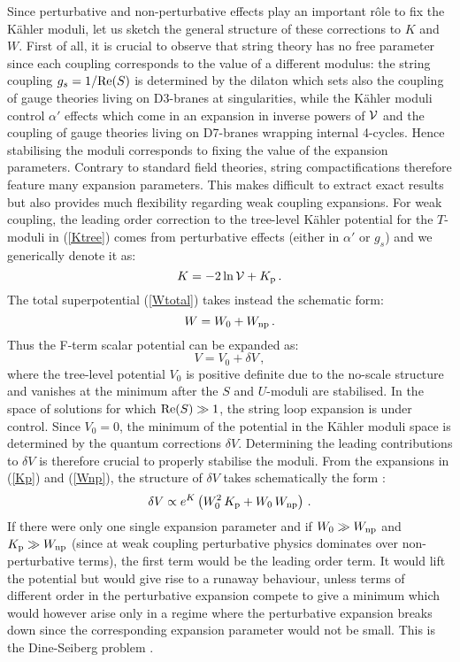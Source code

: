 \documentclass[11pt,a4paper]{article}
\newcommand{\be}{\begin{equation}}
\newcommand{\ee}{\end{equation}}
\newcommand{\vo}{\mathcal{V}}
\def\vo{{{\cal{V}}}}
\begin{document}
Since perturbative and non-perturbative effects play an important r\^ole to fix the K\"ahler moduli, let us sketch the general structure of these corrections to $K$ and $W$. First of all, it is crucial to observe that string theory has no free parameter since each coupling corresponds to the value of a different modulus: the string coupling $g_s = 1/{\rm Re}(S)$ is determined by the dilaton which sets also the coupling of gauge theories living on D3-branes at singularities, while the K\"ahler moduli control $\alpha'$ effects which come in an expansion in inverse powers of $\vo$ and the coupling of gauge theories living on D7-branes wrapping internal 4-cycles. Hence stabilising the moduli corresponds to fixing the value of the expansion parameters. Contrary to standard field theories, string compactifications therefore feature many expansion parameters. This makes difficult to extract exact results but also provides much flexibility regarding weak coupling expansions. For weak coupling, the leading order correction to the tree-level K\"ahler potential for the $T$-moduli in (\ref{Ktree}) comes from perturbative effects (either in $\alpha'$ or $g_s$) and we generically denote it as:
\be
K=-2\ln\vo+ K_{\rm p}\,.
\label{Kp}
\ee
The total superpotential (\ref{Wtotal}) takes instead the schematic form:
\be
W=W_0+ W_{\rm np}\,.
\label{Wnp}
\ee
Thus the F-term scalar potential can be expanded as: 
\be
V=V_0 +\delta V\,,
\ee
where the tree-level potential $V_0$ is positive definite due to the no-scale structure and vanishes at the minimum after the $S$ and $U$-moduli are stabilised. In the space of solutions for which ${\rm Re}(S)\gg 1$, the string loop expansion is under control. Since $V_0=0$, the minimum of the potential in the K\"ahler moduli space is determined by the quantum corrections $\delta V$. Determining the leading contributions to $\delta V$ is therefore crucial to properly stabilise the moduli. From the expansions in (\ref{Kp}) and (\ref{Wnp}), the structure of $\delta V$ takes schematically the form \cite{Conlon:2005ki}:
\be
\delta V\propto e^K\left( W_0^2 \,K_{\rm p} + W_0\, W_{\rm np}\right)\,.
\label{eq:deltaV}
\ee 
If there were only one single expansion parameter and if $W_0\gg W_{\rm np}$ and $K_{\rm p}\gg W_{\rm np}$ (since at weak coupling perturbative physics dominates over non-perturbative terms), the first term would be the leading order term. It would lift the potential but would give rise to a runaway behaviour, unless terms of different order in the perturbative expansion compete to give a minimum which would however arise only in a regime where the perturbative expansion breaks down since the corresponding expansion parameter would not be small. This is the Dine-Seiberg problem \cite{Dine:1985he}. 
\end{document}
